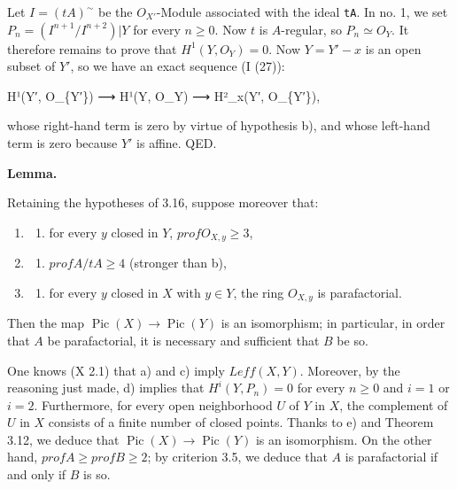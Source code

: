 \documentclass[
]{article}
\newenvironment{Shaded}{}{}
\newcommand{\NormalTok}[1]{#1}
\providecommand{\tightlist}{%
  \setlength{\itemsep}{0pt}\setlength{\parskip}{0pt}}
\begin{document}
Let \(I = (tA)^{\sim}\) be the \(O_{X'}\)-Module associated with the
ideal \texttt{tA}. In no. 1, we set \(P_{n} = (I^{n+1}/I^{n+2})|Y\) for
every \(n \geqslant 0\). Now \(t\) is \(A\)-regular, so
\(P_{n} \simeq O_{Y}\). It therefore remains to prove that
\(H^{1}(Y, O_{Y}) = 0\). Now \(Y = Y' - {x}\) is an open subset of
\(Y'\), so we have an exact sequence (I (27)):

\begin{Shaded}
\begin{Highlighting}[]
\NormalTok{H¹(Y′, O\_\{Y′\}) ⟶ H¹(Y, O\_Y) ⟶ H²\_x(Y′, O\_\{Y′\}),}
\end{Highlighting}
\end{Shaded}

whose right-hand term is zero by virtue of hypothesis b), and whose
left-hand term is zero because \(Y'\) is affine. QED.

\textbf{Lemma.}

Retaining the hypotheses of 3.16, suppose moreover that:

\begin{enumerate}
\def\labelenumi{\arabic{enumi}.}
\tightlist
\item
  \begin{enumerate}
  \def\labelenumii{(\alph{enumii})}
  \setcounter{enumii}{2}
  \tightlist
  \item
    for every \(y\) closed in \(Y\), \(prof O_{X,y} \geqslant 3\),
  \end{enumerate}
\item
  \begin{enumerate}
  \def\labelenumii{(\alph{enumii})}
  \setcounter{enumii}{3}
  \tightlist
  \item
    \(prof A/tA \geqslant 4\) (stronger than b),
  \end{enumerate}
\item
  \begin{enumerate}
  \def\labelenumii{(\alph{enumii})}
  \setcounter{enumii}{4}
  \tightlist
  \item
    for every \(y\) closed in \(X\) with \(y \in Y\), the ring
    \(O_{X,y}\) is parafactorial.
  \end{enumerate}
\end{enumerate}

Then the map \(\operatorname{Pic}(X) \to \operatorname{Pic}(Y)\) is an
isomorphism; in particular, in order that \(A\) be parafactorial, it is
necessary and sufficient that \(B\) be so.

One knows (X 2.1) that a) and c) imply \(Leff(X, Y)\). Moreover, by the
reasoning just made, d) implies that \(H^{i}(Y, P_{n}) = 0\) for every
\(n \geqslant 0\) and \(i = 1\) or \(i = 2\). Furthermore, for every
open neighborhood \(U\) of \(Y\) in \(X\), the complement of \(U\) in
\(X\) consists of a finite number of closed points. Thanks to e) and
Theorem 3.12, we deduce that
\(\operatorname{Pic}(X) \to \operatorname{Pic}(Y)\) is an isomorphism.
On the other hand, \(prof A \geqslant prof B \geqslant 2\); by criterion
3.5, we deduce that \(A\) is parafactorial if and only if \(B\) is so.
\end{document}
